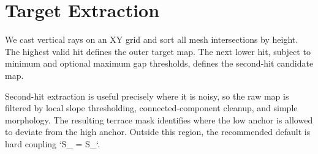 \section{Target Extraction}

We cast vertical rays on an XY grid and sort all mesh intersections by height. The highest valid hit defines the outer target map. The next lower hit, subject to minimum and optional maximum gap thresholds, defines the second-hit candidate map.

Second-hit extraction is useful precisely where it is noisy, so the raw map is filtered by local slope thresholding, connected-component cleanup, and simple morphology. The resulting terrace mask identifies where the low anchor is allowed to deviate from the high anchor. Outside this region, the recommended default is hard coupling `S_{} = S_{}`.
